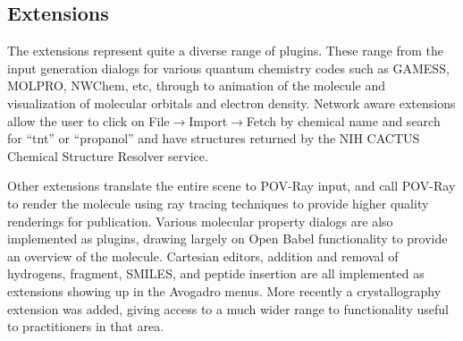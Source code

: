 \documentclass[10pt]{bmc_article}
\newenvironment{bmcformat}{\begin{raggedright}
\baselineskip20pt\sloppy\setboolean{publ}{false}}{\end{raggedright}
\baselineskip20pt\sloppy}
\begin{document}
\begin{bmcformat}
\subsection{Extensions}

The extensions represent quite a diverse range of plugins. These range from the
input generation dialogs for various quantum chemistry codes such as GAMESS,
MOLPRO, NWChem, etc, through to animation of the molecule and visualization of
molecular orbitals and electron density. Network aware extensions allow the user
to click on File$\to$Import$\to$Fetch by chemical name and search for ``tnt'' or
``propanol'' and have structures returned by the NIH CACTUS Chemical Structure
Resolver service.

Other extensions translate the entire scene to POV-Ray input, and call POV-Ray
to render the molecule using ray tracing techniques to provide higher quality
renderings for publication. Various molecular property dialogs are also
implemented as plugins, drawing largely on Open Babel functionality to provide
an overview of the molecule. Cartesian editors, addition and removal of
hydrogens, fragment, SMILES, and peptide insertion are all implemented as
extensions showing up in the Avogadro menus. More recently a crystallography
extension was added, giving access to a much wider range to functionality
useful to practitioners in that area.


\end{bmcformat}
\end{document}
